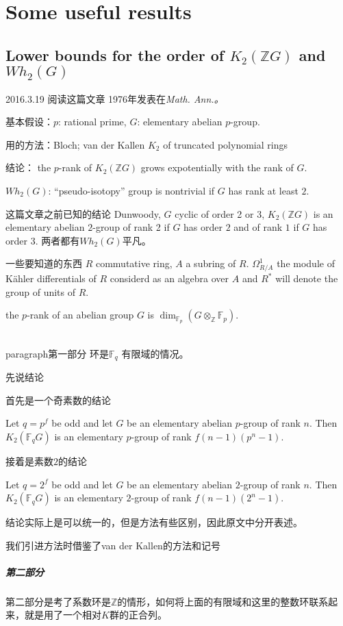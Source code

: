 \chapter{Some useful results}
\section{Lower bounds for the order of $K_2(\mathbb{Z}G)$ and $Wh_2(G)$} %
\label{sec:lower_bounds_for_the_order_of_}
2016.3.19 阅读这篇文章 1976年发表在\em{Math. Ann.}。

基本假设：$p$: rational prime, $G$: elementary abelian $p$-group.

用的方法：Bloch; van der Kallen  $K_2$ of truncated polynomial rings

结论：
the $p$-rank of $K_2(\mathbb{Z}G)$ grows expotentially with the rank of $G$.

$Wh_2(G)$: ``pseudo-isotopy'' group is nontrivial if $G$ has rank at least $2$.


这篇文章之前已知的结论
Dunwoody, $G$ cyclic of order 2 or 3, $K_2(\mathbb{Z}G)$ is an elementary abelian $2$-group of rank 2 if $G$ has order $2$ and of rank $1$ if $G$ has order $3$. 两者都有$Wh_2(G)$平凡。


一些要知道的东西
$R$ commutative ring, $A$ a subring of $R$.
$\Omega_{R/A}^1$ the module of K\"{a}hler differentials of $R$ considerd as an algebra over $A$ and $R^*$ will denote the group of units of $R$.

the $p$-rank of an abelian group $G$ is $\dim_{\mathbb{F}_p}(G\otimes_\mathbb{Z} \mathbb{F}_p)$.

\\paragraph{第一部分} %
\label{par:第一部分}
环是$\mathbb{F}_q$ 有限域的情况。

先说结论

首先是一个奇素数的结论
\begin{prop}
	Let $q=p^f$ be odd and let $G$ be an elementary abelian $p$-group of rank $n$.
	Then $K_2(\mathbb{F}_qG)$ is an elementary $p$-group of rank $f(n-1)(p^n-1)$.
\end{prop}
接着是素数$2$的结论
\begin{prop}
	Let $q=2^f$ be odd and let $G$ be an elementary abelian $2$-group of rank $n$.
	Then $K_2(\mathbb{F}_qG)$ is an elementary $2$-group of rank $f(n-1)(2^n-1)$.
\end{prop}

结论实际上是可以统一的，但是方法有些区别，因此原文中分开表述。

我们引进方法时借鉴了van der Kallen的方法和记号


\paragraph{第二部分} %
\label{par:第二部分}
第二部分是考了系数环是$\mathbb{Z}$的情形，如何将上面的有限域和这里的整数环联系起来，就是用了一个相对$K$群的正合列。
















